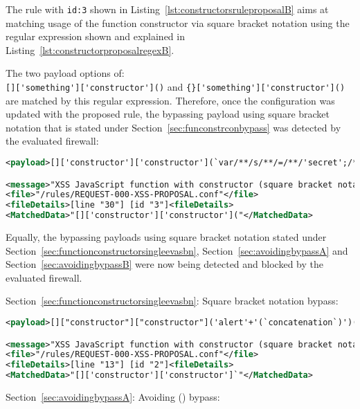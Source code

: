 The rule with \verb|id:3| shown in Listing~\ref{lst:constructorsruleproposalB} aims at matching usage of the function constructor via square bracket notation using the regular expression shown and explained in Listing~\ref{lst:constructorproposalregexB}.

The two payload options of: \\
\verb|[]['something']['constructor']()| and \verb|{}['something']['constructor']()| \\
are matched by this regular expression. Therefore, once the configuration was updated with the proposed rule, the bypassing payload using square bracket notation that is stated under Section~\ref{sec:funconstrconbypass} was detected by the evaluated firewall:

\begin{lstlisting}[style=ruleStyle, language=XML, caption=Function() constructor bypass in square bracket notation blocked, label={lst:constructorsblockedsbn}]
<payload>[]['constructor']['constructor'](`var/**/s/**/=/**/'secret';/**/promp`/**/+/**/`t(s,/**/s)`)()</payload>

<message>"XSS JavaScript function with constructor (square bracket notation)"</message>
<file>"/rules/REQUEST-000-XSS-PROPOSAL.conf"</file>
<fileDetails>[line "30"] [id "3"]<fileDetails>
<MatchedData>"[]['constructor']['constructor']("</MatchedData>
\end{lstlisting}

Equally, the bypassing payloads using square bracket notation stated under Section~\ref{sec:functionconstructorsingleevasbn}, Section~\ref{sec:avoidingbypassA} and Section~\ref{sec:avoidingbypassB} were now being detected and blocked by the evaluated firewall. 

Section~\ref{sec:functionconstructorsingleevasbn}: Square bracket notation bypass:

\begin{lstlisting}[style=ruleStyle, language=XML, caption=square bracket notation bypass blocked]
<payload>[]["constructor"]["constructor"]('alert'+'(`concatenation`)')()</payload>

<message>"XSS JavaScript function with constructor (square bracket notation)"</message>
<file>"/rules/REQUEST-000-XSS-PROPOSAL.conf"</file>
<fileDetails>[line "13"] [id "2"]<fileDetails>
<MatchedData>"[]['constructor']['constructor']`"</MatchedData>
\end{lstlisting}

Section~\ref{sec:avoidingbypassA}: Avoiding () bypass:

